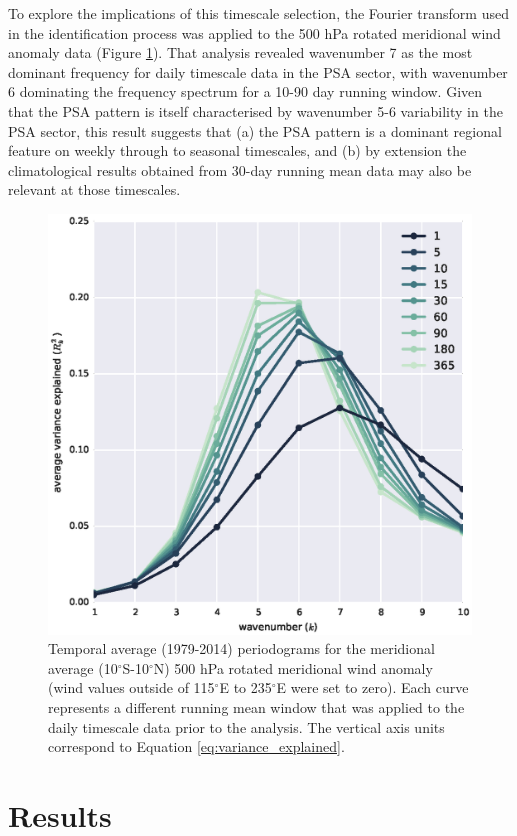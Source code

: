 To explore the implications of this timescale selection, the Fourier transform used in the identification process was applied to the 500 hPa rotated meridional wind anomaly data (Figure \ref{fig:periodogram}). That analysis revealed wavenumber 7 as the most dominant frequency for daily timescale data in the PSA sector, with wavenumber 6 dominating the frequency spectrum for a 10-90 day running window. Given that the PSA pattern is itself characterised by wavenumber 5-6 variability in the PSA sector, this result suggests that (a) the PSA pattern is a dominant regional feature on weekly through to seasonal timescales, and (b) by extension the climatological results obtained from 30-day running mean data may also be relevant at those timescales.

\begin{figure}
\begin{center}
\includegraphics[width=0.7\columnwidth]{figures/psa/vrot-r2spectrum_ERAInterim_500hPa_daily-anom-wrt-all_native-np20N260E.eps}
\caption{\label{fig:periodogram}
Temporal average (1979-2014) periodograms for the meridional average (10$^{\circ}$S-10$^{\circ}$N) 500 hPa rotated meridional wind anomaly (wind values outside of 115$^{\circ}$E to 235$^{\circ}$E were set to zero). Each curve represents a different running mean window that was applied to the daily timescale data prior to the analysis. The vertical axis units correspond to Equation \ref{eq:variance_explained}.%
}
\end{center}
\end{figure}



\section{Results}

